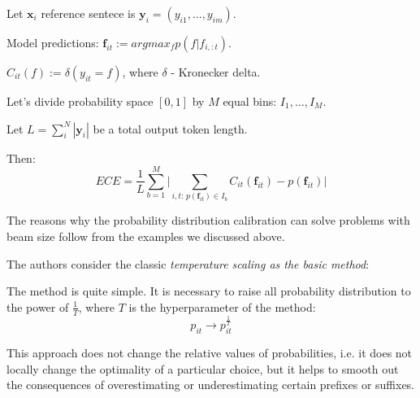 \documentclass[a4paper,14pt]{extarticle}
\begin{document}
	Let $\mathbf{x}_i$ reference sentece is $\mathbf{y}_i = (y_{i1}, \dots, y_{im})$.
	
	Model predictions: $\mathbf{f}_{it} := argmax_{f} p(f | f_{i, :t})$.
	
	$C_{it}(f) := \delta(y_{it} = f)$, where $\delta$ - Kronecker delta.
	
	Let's divide probability space $[0, 1]$ by $M$ equal bins: $I_1, \dots, I_M$.
	
	Let $L = \sum_i^N |\mathbf{y}_i|$ be a total output token length.
	
	Then:
	\begin{equation}
		ECE = \frac1{L}\sum_{b=1}^{M}\Big|\sum_{i, t:\, p(\mathbf{f}_{it}) \in I_b} C_{it}(\mathbf{f}_{it}) - p(\mathbf{f}_{it})\Big|
	\end{equation}
	
	The reasons why the probability distribution calibration can solve problems with beam size follow from the examples we discussed above.
	
	The authors consider the classic \textit{temperature scaling as the basic method}:
	
	The method is quite simple. It is necessary to raise all probability distribution to the power of $\frac1{T}$, where $T$ is the hyperparameter of the method:
	\[
		p_{it} \rightarrow p_{it}^{\frac1{T}}
	\]
	
	This approach does not change the relative values of probabilities, i.e. it does not locally change the optimality of a particular choice, but it helps to smooth out the consequences of overestimating or underestimating certain prefixes or suffixes.
	
	\begin{figure}[t]
	\end{figure}
	
\end{document}
